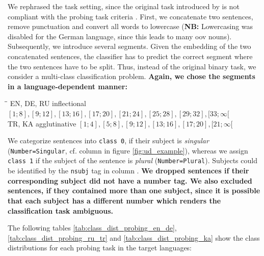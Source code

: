  We rephrased the task setting, since the original task introduced by \citep{Kim.2019} is not compliant with the probing task criteria \citep{Conneau.2018a}. First, we concatenate two sentences, remove punctuation and convert all words to lowercase (\textbf{NB:} Lowercasing was disabled for the German language, since this leads to many \gls{oov} nouns). Subsequently, we introduce several segments. Given the embedding of the two concatenated sentences, the classifier has to predict the correct segment where the two sentences have to be split. Thus, instead of the original binary task, we consider a multi-class classification problem. \textbf{Again, we chose the segments in a language-dependent manner:}

\begin{tabbing}
	\hspace*{3cm}\=\hspace*{4cm}\=\kill
	EN, DE, RU		\>	inflectional		\>	$[1;8], [9;12], [13;16], [17;20], [21;24], [25;28], [29;32], [33;\infty[$	\\[2mm]
	TR, KA		\>	agglutinative	\>	$[1;4], [5;8], [9;12], [13;16], [17;20], [21;\infty[$
\end{tabbing}

 We categorize sentences into \texttt{class 0}, if their subject is \textit{singular} (\texttt{Number=Singular}, cf. column  in figure \vref{fig:ud_example}), whereas we assign \texttt{class 1} if the subject of the sentence is \textit{plural} (\texttt{Number=Plural}). Subjects could be identified by the \texttt{nsubj} tag in column . \textbf{We dropped sentences if their corresponding subject did not have a number tag. We also excluded sentences, if they contained more than one subject, since it is possible that each subject has a different number which renders the classification task ambiguous.}

The following tables \vref{tab:class_dist_probing_en_de}, \vref{tab:class_dist_probing_ru_tr} and \vref{tab:class_dist_probing_ka} show the class distributions for each probing task in the target languages:







